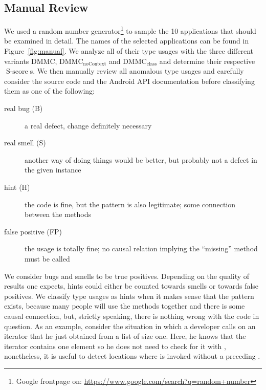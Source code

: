 \subsection{Manual Review}

We used a random number generator\footnote{Google frontpage on: \url{https://www.google.com/search?q=random+number}} to sample the 10 applications that should be examined in detail.
The names of the selected applications can be found in Figure~\ref{fig:manual}.
We analyze all of their type usages with the three different variants $\text{DMMC}$, $\text{DMMC}_{\text{noContext}}$ and $\text{DMMC}_{\text{class}}$ and determine their respective $\operatorname{S-score}$s.
We then manually review all anomalous type usages and carefully consider the source code and the Android API documentation before classifying them as one of the following:
\begin{description}
    \item [real bug (B)] a real defect, change definitely necessary
    \item [real smell (S)] another way of doing things would be better, but probably not a defect in the given instance
    \item [hint (H)] the code is fine, but the pattern is also legitimate; some connection between the methods
    \item [false positive (FP)] the usage is totally fine; no causal relation implying the ``missing'' method must be called
\end{description}


We consider bugs and smells to be true positives.
Depending on the quality of results one expects, hints could either be counted towards smells or towards false positives.
We classify type usages as hints when it makes sense that the pattern exists, because many people will use the methods together and there is some causal connection, but, strictly speaking, there is nothing wrong with the code in question.
As an example, consider the situation in which a developer calls  on an iterator that he just obtained from a list of size one.
Here, he knows that the iterator contains one element so he does not need to check for it with , nonetheless, it is useful to detect locations where  is invoked without a preceding .

